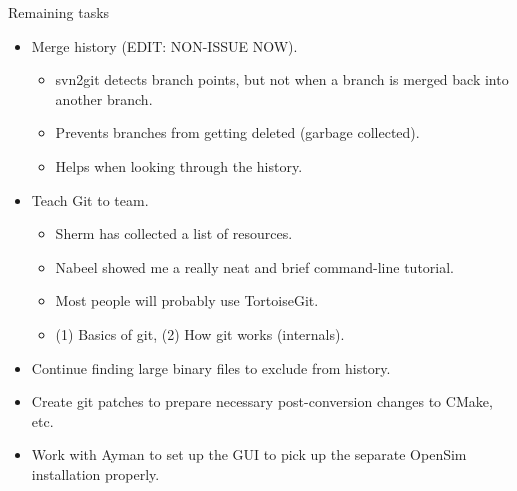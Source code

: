\documentclass[pdf, 8pt]{beamer}
\begin{document}
\begin{frame}{Remaining tasks}
\begin{itemize}
\item Merge history (EDIT: NON-ISSUE NOW).
    \begin{itemize}
            \item svn2git detects branch points, but not when a branch is
                merged back into another branch.
            \item Prevents branches from getting deleted (garbage
                collected).
            \item Helps when looking through the history.
    \end{itemize}
\item Teach Git to team.
    \begin{itemize}
        \item Sherm has collected a list of resources.
        \item Nabeel showed me a really neat and brief command-line tutorial.
        \item Most people will probably use TortoiseGit.
        \item (1) Basics of git, (2) How git works (internals).
    \end{itemize}
\item Continue finding large binary files to exclude from history.
\item Create git patches to prepare necessary post-conversion changes to CMake,
    etc.
\item Work with Ayman to set up the GUI to pick up the separate OpenSim
    installation properly.
\end{itemize}
\end{frame}
\end{document}
